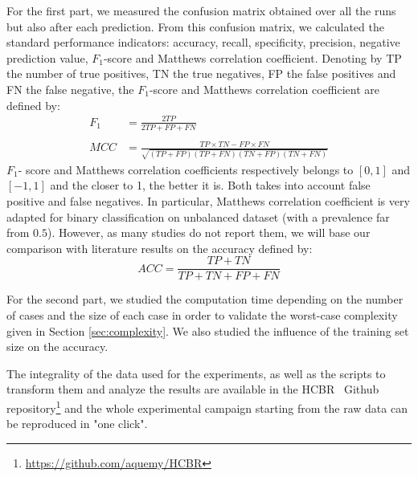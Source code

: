 \documentclass[sigconf,edbt]{acmart-edbt-workshops}
\def\HCBR{{\sc HCBR}}
\begin{document}
 For the first part, we measured the confusion matrix obtained over all the runs but also after each prediction. From this confusion matrix, we calculated the standard performance indicators: accuracy, recall, specificity, precision, negative prediction value, $F_1$-score and Matthews correlation coefficient. Denoting by TP the number of true positives, TN the true negatives, FP the false positives and FN the false negative, the $F_1$-score and Matthews correlation coefficient are defined by:
\begin{align*}
F_1 & = \frac{2 TP}{ 2TP + FP + FN} \\
    & \\
MCC & = \frac{TP \times TN - FP \times FN}{\sqrt{(TP + FP)(TP + FN)(TN + FP)(TN + FN)}}
\end{align*}
$F_1$- score and Matthews correlation coefficients respectively belongs to $[0,1]$ and $[-1,1]$ and the closer to 1, the better it is. Both takes into account false positive and false negatives. In particular, Matthews correlation coefficient is very adapted for binary classification on unbalanced dataset (with a prevalence far from $0.5$). However, as many studies do not report them, we will base our comparison with literature results on the accuracy defined by:
\[
  ACC = \frac{TP + TN}{TP + TN + FP + FN}
\]

For the second part, we studied the computation time depending on the number of cases and the size of each case in order to validate the worst-case complexity given in Section \ref{sec:complexity}. We also studied the influence of the training set size on the accuracy.

The integrality of the data used for the experiments, as well as the scripts to transform them and analyze the results are available in the \HCBR~ Github repository\footnote{\href{https://github.com/aquemy/HCBR}{https://github.com/aquemy/HCBR}} and the whole experimental campaign starting from the raw data can be reproduced in "one click". 
\end{document}
